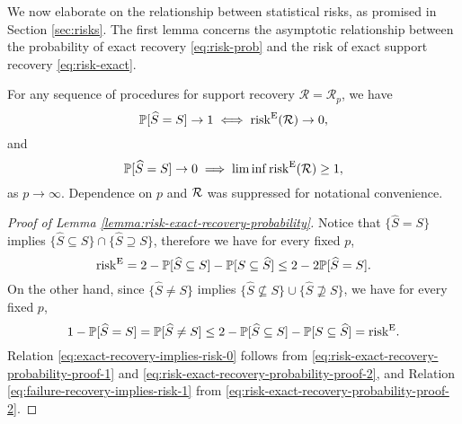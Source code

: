 We now elaborate on the relationship between statistical risks, as promised in Section \ref{sec:risks}.
The first lemma concerns the asymptotic relationship between the probability of exact recovery \eqref{eq:risk-prob} and the risk of exact support recovery \eqref{eq:risk-exact}.

\begin{lemma} \label{lemma:risk-exact-recovery-probability}
For any sequence of procedures for support recovery $\mathcal{R} = \mathcal{R}_p$, we have
\begin{equation} \label{eq:exact-recovery-implies-risk-0}
    \P[\widehat{S} = S] \to 1 \iff \mathrm{risk}^{\mathrm{E}}(\mathcal{R})\to0,
\end{equation}
and
\begin{equation} \label{eq:failure-recovery-implies-risk-1}
    \P[\widehat{S} = S] \to 0 \implies \liminf\mathrm{risk}^{\mathrm{E}}(\mathcal{R})\ge1,
\end{equation}
as $p\to\infty$. Dependence on $p$ and ${\cal R}$ was suppressed for notational convenience.
\end{lemma}


\begin{proof}[Proof of Lemma \ref{lemma:risk-exact-recovery-probability}]
Notice that $\{\widehat{S}=S\}$ implies $\{\widehat{S}\subseteq S\} \cap \{\widehat{S}\supseteq S\}$, therefore we have for every fixed $p$,
\begin{equation} \label{eq:risk-exact-recovery-probability-proof-1}
    \mathrm{risk}^{\mathrm{E}} 
    = 2 - \P[\widehat{S} \subseteq S] - \P[S \subseteq \widehat{S}] \\
    \le 2 - 2\P[\widehat{S}=S].
\end{equation}
On the other hand, since $\{\widehat{S}\neq S\}$ implies $\{\widehat{S}\not\subseteq S\} \cup \{\widehat{S}\not\supseteq S\}$, we have for every fixed $p$,
\begin{equation} \label{eq:risk-exact-recovery-probability-proof-2}
    1 - \P[\widehat{S}=S]
    = \P[\widehat{S}\neq S]
    \le 2 - \P[\widehat{S} \subseteq S] - \P[S \subseteq \widehat{S}]
    = \mathrm{risk}^{\mathrm{E}}. 
\end{equation}
Relation \eqref{eq:exact-recovery-implies-risk-0} follows from \eqref{eq:risk-exact-recovery-probability-proof-1} and \eqref{eq:risk-exact-recovery-probability-proof-2}, and Relation \eqref{eq:failure-recovery-implies-risk-1} from \eqref{eq:risk-exact-recovery-probability-proof-2}.
\end{proof}


